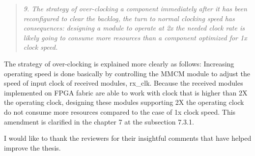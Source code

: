 \documentclass{article}
\begin{document}
\begin{quote}
\emph{9. The strategy of over-clocking a component immediately after it has been reconfigured to clear the backlog, the turn to normal clocking speed has consequences: designing a module to operate at 2x the needed clock rate is likely going to consume more resources than a component optimized for 1x clock speed.}
\end{quote}
The strategy of over-clocking is explained more clearly as follows:
Increasing operating speed is done basically by controlling the MMCM module to adjust the speed of input clock of received modules, rx\_clk. Because the received modules implemented on FPGA fabric are able to work with clock that is higher than 2X the operating clock, designing these modules supporting 2X the operating clock do not consume more resources compared to the case of 1x clock speed.
This amendment is clarified in the chapter 7 at the subsection 7.3.1.

I would like to thank the reviewers for their insightful comments that have helped improve the thesis.
\end{document}

